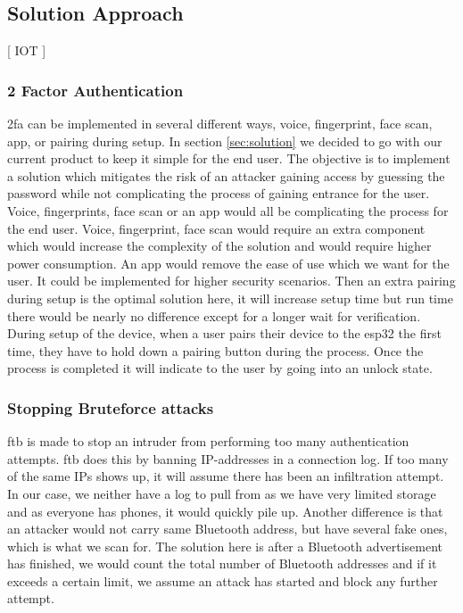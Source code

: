 \subsection{Solution Approach}
[ IOT ]
\newline
\subsubsection{2 Factor Authentication}
\gls{2fa} can be implemented in several different ways, voice, fingerprint, face scan, app, or pairing during setup. In section \ref{sec:solution} we decided to go with our current product to keep it simple for the end user. The objective is to implement a solution which mitigates the risk of an attacker gaining access by guessing the password while not complicating the process of gaining entrance for the user. Voice, fingerprints, face scan or an app would all be complicating the process for the end user. Voice, fingerprint, face scan would require an extra component which would increase the complexity of the solution and would require higher power consumption. An app would remove the ease of use which we want for the user. It could be implemented for higher security scenarios. Then an extra pairing during setup is the optimal solution here, it will increase setup time but run time there would be nearly no difference except for a longer wait for verification. During setup of the device, when a user pairs their device to the esp32 the first time, they have to hold down a pairing button during the process. Once the process is completed it will indicate to the user by going into an unlock state.

\subsubsection{Stopping Bruteforce attacks}
\gls{ftb} is made to stop an intruder from performing too many authentication attempts\cite{f2b}. \gls{ftb} does this by banning IP-addresses in a connection log\cite{f2bHowTo}. If too many of the same IPs shows up, it will assume there has been an infiltration attempt. In our case, we neither have a log to pull from as we have very limited storage and as everyone has phones, it would quickly pile up. Another difference is that an attacker would not carry same Bluetooth address, but have several fake ones, which is what we scan for. The solution here is after a Bluetooth advertisement has finished, we would count the total number of Bluetooth addresses and if it exceeds a certain limit, we assume an attack has started and block any further attempt.

